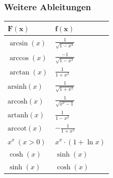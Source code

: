 \documentclass[a4paper,10pt]{article}
\begin{document}
\subsubsection{Weitere Ableitungen}
\begin{center}
  \begin{tabularx}{\linewidth}{>{\centering\arraybackslash}X>{\centering\arraybackslash}X}
  \toprule
  $\mathbf{F(x)}$ & $\mathbf{f(x)}$ \\
  \midrule
  $\arcsin(x)$ & $\frac{1}{\sqrt{1 - x^2}}$ \\
  $\arccos(x)$ & $\frac{-1}{\sqrt{1 - x^2}}$ \\
  $\arctan(x)$ & $\frac{1}{1 + x^2}$ \\ 
  $\text{arsinh}(x)$ & $\frac{1}{\sqrt{1 + x^2}}$ \\
  $\text{arcosh}(x)$ & $\frac{1}{\sqrt{x^2 - 1}}$ \\
  $\text{artanh}(x)$ & $\frac{1}{1 - x^2}$ \\
  $\text{arccot}(x)$ & $-\frac{1}{1 + x^2}$ \\
  $x^x \ (x > 0)$ & $x^x \cdot (1 + \ln x)$ \\
  $\cosh(x)$ & $\sinh(x)$ \\
  $\sinh(x)$ & $\cosh(x)$ \\
  \bottomrule
  \end{tabularx}
\end{center}
\end{document}
